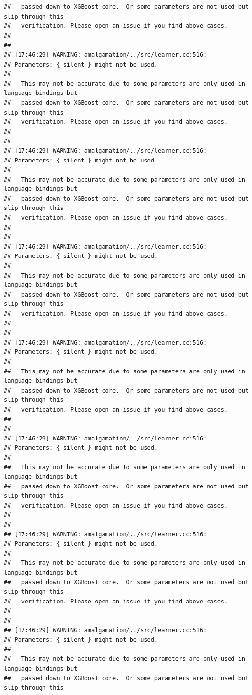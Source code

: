 \documentclass[AMS,STIX2COL]{WileyNJD-v2}\usepackage[]{graphicx}\usepackage[]{color}
\makeatletter
\newenvironment{kframe}{%
 \def\at@end@of@kframe{}%
 \ifinner\ifhmode%
  \def\at@end@of@kframe{\end{minipage}}%
  \begin{minipage}{\columnwidth}%
 \fi\fi%
 \def\FrameCommand##1{\hskip\@totalleftmargin \hskip-\fboxsep
 \colorbox{shadecolor}{##1}\hskip-\fboxsep
     \hskip-\linewidth \hskip-\@totalleftmargin \hskip\columnwidth}%
 \MakeFramed {\advance\hsize-\width
   \@totalleftmargin\z@ \linewidth\hsize
   \@setminipage}}%
 {\par\unskip\endMakeFramed%
 \at@end@of@kframe}
\newenvironment{knitrout}{}{} %
\makeatother
\begin{document}
\begin{knitrout}
\begin{kframe}
\begin{verbatim}
##   passed down to XGBoost core.  Or some parameters are not used but slip through this
##   verification. Please open an issue if you find above cases.
## 
## 
## [17:46:29] WARNING: amalgamation/../src/learner.cc:516: 
## Parameters: { silent } might not be used.
## 
##   This may not be accurate due to some parameters are only used in language bindings but
##   passed down to XGBoost core.  Or some parameters are not used but slip through this
##   verification. Please open an issue if you find above cases.
## 
## 
## [17:46:29] WARNING: amalgamation/../src/learner.cc:516: 
## Parameters: { silent } might not be used.
## 
##   This may not be accurate due to some parameters are only used in language bindings but
##   passed down to XGBoost core.  Or some parameters are not used but slip through this
##   verification. Please open an issue if you find above cases.
## 
## 
## [17:46:29] WARNING: amalgamation/../src/learner.cc:516: 
## Parameters: { silent } might not be used.
## 
##   This may not be accurate due to some parameters are only used in language bindings but
##   passed down to XGBoost core.  Or some parameters are not used but slip through this
##   verification. Please open an issue if you find above cases.
## 
## 
## [17:46:29] WARNING: amalgamation/../src/learner.cc:516: 
## Parameters: { silent } might not be used.
## 
##   This may not be accurate due to some parameters are only used in language bindings but
##   passed down to XGBoost core.  Or some parameters are not used but slip through this
##   verification. Please open an issue if you find above cases.
## 
## 
## [17:46:29] WARNING: amalgamation/../src/learner.cc:516: 
## Parameters: { silent } might not be used.
## 
##   This may not be accurate due to some parameters are only used in language bindings but
##   passed down to XGBoost core.  Or some parameters are not used but slip through this
##   verification. Please open an issue if you find above cases.
## 
## 
## [17:46:29] WARNING: amalgamation/../src/learner.cc:516: 
## Parameters: { silent } might not be used.
## 
##   This may not be accurate due to some parameters are only used in language bindings but
##   passed down to XGBoost core.  Or some parameters are not used but slip through this
##   verification. Please open an issue if you find above cases.
## 
## 
## [17:46:29] WARNING: amalgamation/../src/learner.cc:516: 
## Parameters: { silent } might not be used.
## 
##   This may not be accurate due to some parameters are only used in language bindings but
##   passed down to XGBoost core.  Or some parameters are not used but slip through this

\end{verbatim}
\end{kframe}
\end{knitrout}
\end{document}
